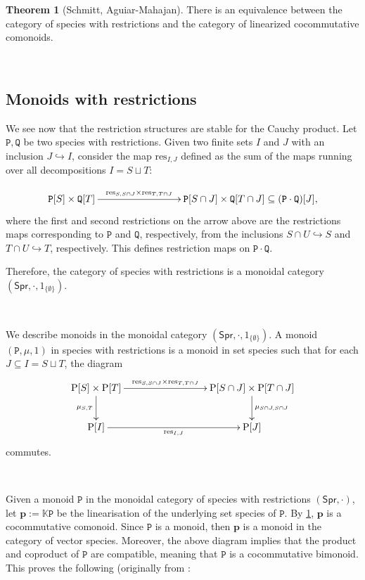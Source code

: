 \documentclass[12pt, reqno]{amsart}
\theoremstyle{definition}
\newtheorem{thm}{Theorem}[section]
\newcommand{\Spr}{\mathsf{Spr}} %
\newcommand{\rP}{\mathrm{P}}
\newcommand{\prP}{\mathtt{P}}
\newcommand{\prQ}{\mathtt{Q}}
\newcommand{\tp}{\mathbf{p}}
\begin{document}
\begin{thm}[Schmitt, Aguiar-Mahajan]\label{thm:swr_lcc}
There is an equivalence between the category of species with restrictions and the category of linearized cocommutative comonoids.
\end{thm}

\

\subsection{Monoids with restrictions}
We see now that the restriction structures are stable for the Cauchy product.
Let $\prP, \prQ$ be two species with restrictions.
Given two finite sets $I$ and $J$ with an inclusion $J \hookrightarrow I$, consider the map $\text{res}_{I,J}$ defined as the sum of the maps running over all decompositions $I=S\sqcup T$:

\[\xymatrix{
\prP[S]\times \prQ[T] \ar[rrr]^-{\text{res}_{S, S\cap J} \times \text{res}_{T, T\cap J}}&&& \prP[S\cap J]\times \prQ[T\cap J] \subseteq (\prP \cdot \prQ)[J],
}\]
where the first and second restrictions on the arrow above are the restrictions maps corresponding to $\prP$ and $\prQ$, respectively, from the inclusions $S \cap U \hookrightarrow S$ and $T \cap U \hookrightarrow T$, respectively. 
This defines restriction maps on $\prP \cdot \prQ$.
\

Therefore, the category of species with restrictions is a monoidal category $(\Spr, \cdot, \mathrm{1}_{\{\emptyset\}})$.

\

We describe monoids in the monoidal category $(\Spr, \cdot, \mathrm{1}_{\{\emptyset \} })$. 
A monoid $(\prP, \mu, 1)$ in species with restrictions is a monoid in set species such that for each $J \subseteq I=S\sqcup T$, the diagram
\[\xymatrix{
\rP[S]\times \rP[T]\ar[d]_-{\mu_{S,T}} \ar[rrr]^-{\text{res}_{S, S\cap J} \times \text{res}_{T, T\cap J}}&&&\rP[S \cap J]\times \rP[T\cap J]\ar[d]^-{\mu_{S \cap J, S\cap J}}\\
\rP[I]\ar[rrr]_-{\text{res}_{I,J}}&&& \rP[J]
}\]
commutes.

\

Given a monoid $\prP$ in the monoidal category of species with restrictions $(\Spr, \cdot)$, let $\tp:=\mathbb{K}\prP$ be the linearisation of the underlying set species of $\prP$. 
By \cref{thm:swr_lcc}, $\tp$ is a cocommutative comonoid. Since $\prP$ is a monoid, then $\tp$ is a monoid in the category of vector species. Moreover, the above diagram implies that the product and coproduct of $\prP$ are compatible, meaning that $\prP$ is a cocommutative bimonoid. 
This proves the following (originally from \cite{AM2010}:
\end{document}
